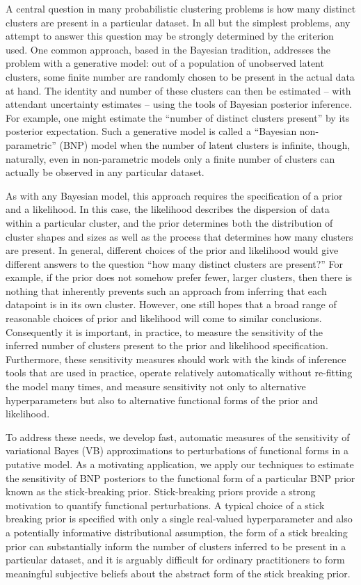 A central question in many probabilistic clustering problems is how many
distinct clusters are present in a particular dataset. In all but the simplest
problems, any attempt to answer this question may be strongly determined by the
criterion used. One common approach, based in the Bayesian tradition, addresses
the problem with a generative model: out of a population of unobserved latent
clusters, some finite number are randomly chosen to be present in the actual
data at hand. The identity and number of these clusters can then be estimated –
with attendant uncertainty estimates – using the tools of Bayesian posterior
inference. For example, one might estimate the ``number of distinct clusters
present'' by its posterior expectation. Such a generative model is called a
``Bayesian non-parametric'' (BNP) model when the number of latent clusters is
infinite, though, naturally, even in non-parametric models only a finite number
of clusters can actually be observed in any particular dataset.

As with any Bayesian model, this approach requires the specification of a prior
and a likelihood. In this case, the likelihood describes the dispersion of data
within a particular cluster, and the prior determines both the distribution of
cluster shapes and sizes as well as the process that determines how many
clusters are present. In general, different choices of the prior and likelihood
would give different answers to the question “how many distinct clusters are
present?” For example, if the prior does not somehow prefer fewer, larger
clusters, then there is nothing that inherently prevents such an approach from
inferring that each datapoint is in its own cluster. However, one still hopes
that a broad range of reasonable choices of prior and likelihood will come to
similar conclusions. Consequently it is important, in practice, to measure the
sensitivity of the inferred number of clusters present to the prior and
likelihood specification. Furthermore, these sensitivity measures should work
with the kinds of inference tools that are used in practice, operate relatively
automatically without re-fitting the model many times, and measure sensitivity
not only to alternative hyperparameters but also to alternative functional forms
of the prior and likelihood.

To address these needs, we develop fast, automatic measures of the sensitivity
of variational Bayes (VB) approximations to perturbations of functional forms in
a putative model. As a motivating application, we apply our techniques to
estimate the sensitivity of BNP posteriors to the functional form of a
particular BNP prior known as the stick-breaking prior. Stick-breaking priors
provide a strong motivation to quantify functional perturbations. A typical
choice of a stick breaking prior is specified with only a single real-valued
hyperparameter and also a potentially informative distributional assumption, the
form of a stick breaking prior can substantially inform the number of clusters
inferred to be present in a particular dataset, and it is arguably difficult for
ordinary practitioners to form meaningful subjective beliefs about the abstract
form of the stick breaking prior.


